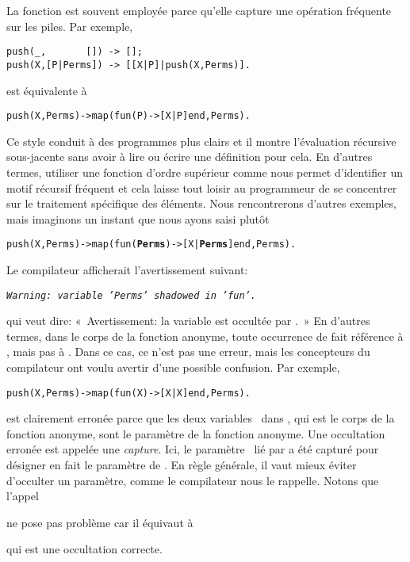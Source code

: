 La fonction  est souvent employée parce qu'elle capture
une opération fréquente sur les piles. Par exemple,
\begin{verbatim}
push(_,       []) -> [];
push(X,[P|Perms]) -> [[X|P]|push(X,Perms)].
\end{verbatim}
est équivalente à
\begin{alltt}
push(X,Perms) -> map(fun(P) -> [X|P] end,Perms).
\end{alltt}
Ce style conduit à des programmes plus clairs et il montre
l'évaluation récursive sous-jacente sans avoir à lire ou écrire une
définition pour cela. En d'autres termes, utiliser une fonction
d'ordre supérieur comme  nous permet d'identifier un
motif récursif fréquent et cela laisse tout loisir au programmeur de
se concentrer sur le traitement spécifique des éléments. Nous
rencontrerons d'autres exemples, mais imaginons un instant que nous
ayons saisi plutôt
\begin{alltt}
push(X,Perms) -> map(fun(\textbf{Perms}) -> [X|\textbf{Perms}] end,Perms).
\end{alltt}
Le compilateur \Erlang afficherait l'avertissement suivant:
\begin{center}
\emph{\texttt{Warning: variable 'Perms' shadowed in
    'fun'.}}\label{shadowing}
\end{center}
qui veut dire: «~Avertissement: la variable  est
occultée par .~» En d'autres termes, dans le corps de la
fonction anonyme, toute occurrence de  fait référence à
, mais pas à . Dans ce cas,
ce n'est pas une erreur, mais les concepteurs du compilateur ont voulu
avertir d'une possible confusion. Par exemple,
\begin{alltt}
push(X,Perms) -> map(fun(X) -> [X|X] end,Perms).\hfill% \emph{Capture}
\end{alltt}
est clairement erronée parce que les deux variables~ dans
\erlcode{[X|X]}, qui est le corps de la fonction anonyme, sont le
paramètre de la fonction anonyme. Une occultation erronée est appelée
une \emph{capture}. Ici, le paramètre~ lié par
 a été capturé pour désigner en fait le
paramètre de . En règle générale, il vaut mieux éviter
d'occulter un paramètre, comme le compilateur \Erlang nous le
rappelle. Notons que l'appel
\begin{center}
\end{center}
ne pose pas problème car il équivaut à
\begin{center}
\end{center}
qui est une occultation correcte.

